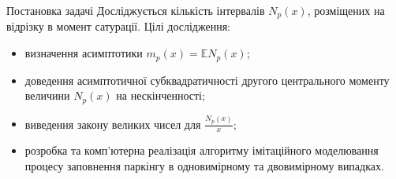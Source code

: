 \begin{frame}{Постановка задачі}
	Досліджується кількість інтервалів $N_{p}(x)$, розміщених на відрізку в момент сатурації.
	Цілі дослідження:
	\begin{itemize}
		\item визначення асимптотики $m_{p}(x) = \mathbb{E}N_{p}(x)$;
		\item доведення асимптотичної субквадратичності другого центрального моменту величини $N_{p}(x)$ на нескінченності;
		\item виведення закону великих чисел для $\frac{N_{p}(x)}{x}$;
		\item розробка та комп'ютерна реалізація алгоритму імітаційного моделювання процесу заповнення паркінгу в одновимірному та двовимірному випадках.
	\end{itemize}
	\note{
	}
\end{frame}